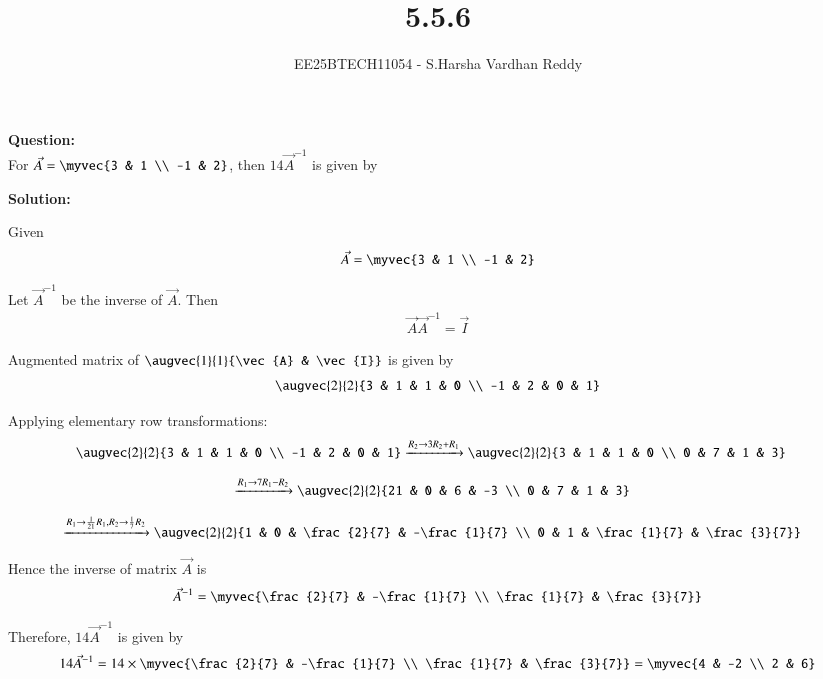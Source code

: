 \documentclass[journal]{IEEEtran}
\begin{document}


\title{5.5.6}
\author{EE25BTECH11054 - S.Harsha Vardhan Reddy}
\maketitle
\vspace{-1cm}

\renewcommand{\thefigure}{\theenumi}
\renewcommand{\thetable}{\theenumi}
\setlength{\intextsep}{10pt}

\renewcommand{\thetable}{\theenumi}

\textbf{Question:} \\
For $\vec{A} = \myvec{3 & 1 \\ -1 & 2}$, then $14\vec{A}^{-1}$ is given by

\textbf{Solution:}

Given
\begin{align}
\vec{A} = \myvec{3 & 1 \\ -1 & 2}
\end{align}

Let $\vec{A}^{-1}$ be the inverse of $\vec{A}$. Then
\begin{align}
\vec{A}\vec{A}^{-1} = \vec{I}
\end{align}

Augmented matrix of $\augvec{1}{1}{\vec{A} & \vec{I}}$ is given by
\begin{align}
\augvec{2}{2}{3 & 1 & 1 & 0 \\ -1 & 2 & 0 & 1}
\end{align}

Applying elementary row transformations:
\begin{align}
&\augvec{2}{2}{3 & 1 & 1 & 0 \\ -1 & 2 & 0 & 1} \xrightarrow{R_2 \rightarrow 3R_2 + R_1} \augvec{2}{2}{3 & 1 & 1 & 0 \\ 0 & 7 & 1 & 3}
\end{align}

\begin{align}
&\xrightarrow{R_1 \rightarrow 7R_1 - R_2} \augvec{2}{2}{21 & 0 & 6 & -3 \\ 0 & 7 & 1 & 3}
\end{align}

\begin{align}
&\xrightarrow{R_1 \rightarrow \frac{1}{21}R_1, R_2 \rightarrow \frac{1}{7}R_2} \augvec{2}{2}{1 & 0 & \frac{2}{7} & -\frac{1}{7} \\ 0 & 1 & \frac{1}{7} & \frac{3}{7}}
\end{align}

Hence the inverse of matrix $\vec{A}$ is
\begin{align}
\vec{A}^{-1} = \myvec{\frac{2}{7} & -\frac{1}{7} \\ \frac{1}{7} & \frac{3}{7}}
\end{align}

Therefore, $14\vec{A}^{-1}$ is given by
\begin{align}
14\vec{A}^{-1} = 14 \times \myvec{\frac{2}{7} & -\frac{1}{7} \\ \frac{1}{7} & \frac{3}{7}} = \myvec{4 & -2 \\ 2 & 6}
\end{align}
\end{document}
